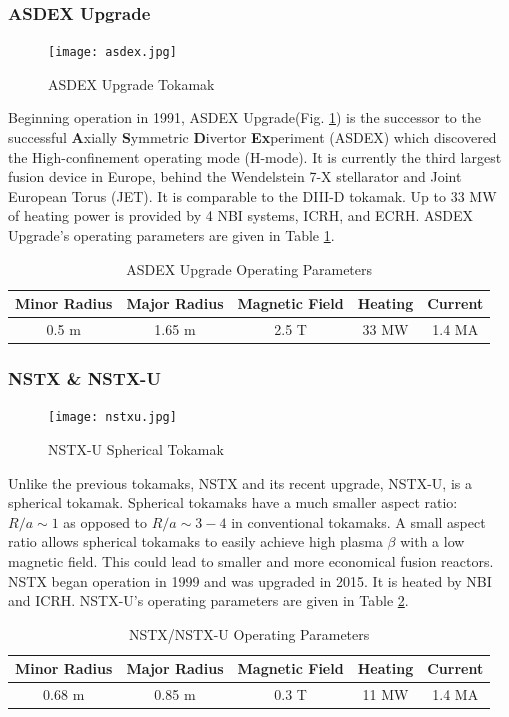 \subsubsection{ASDEX Upgrade}
\begin{figure}[ht]
    \centering
    \texttt{[image: asdex.jpg]}
    \caption{ASDEX Upgrade Tokamak\cite{geiger2013thesis}}
    \label{fig:augd}
\end{figure}
Beginning operation in 1991, ASDEX Upgrade(Fig. \ref{fig:augd}) is the successor to the successful \textbf{A}xially \textbf{S}ymmetric \textbf{D}ivertor \textbf{Ex}periment (ASDEX) which discovered the High-confinement operating mode (H-mode)\cite{wagner1982hmode}. It is currently the third largest fusion device in Europe, behind the Wendelstein 7-X stellarator\cite{wendelstein7x1993} and Joint European Torus (JET)\cite{jet1985}. It is comparable to the DIII-D tokamak. Up to 33 MW of heating power is provided by 4 NBI systems, ICRH, and ECRH. ASDEX Upgrade's operating parameters are given in Table \ref{tab:augd}. 
\begin{table}[]
    \centering
    \caption{ASDEX Upgrade Operating Parameters}
    \label{tab:augd}
    \begin{tabular}{ccccc}
        \textbf{Minor Radius} & \textbf{Major Radius} & \textbf{Magnetic Field} & \textbf{Heating} & \textbf{Current} \\ \hline \hline
        0.5 m & 1.65 m & 2.5 T & 33 MW & 1.4 MA \\ \hline
    \end{tabular}
\end{table}

\subsubsection{NSTX \& NSTX-U}
\begin{figure}[ht]
    \centering
    \texttt{[image: nstxu.jpg]}
    \caption{NSTX-U Spherical Tokamak}
    \label{fig:nstx}
\end{figure}
Unlike the previous tokamaks, NSTX and its recent upgrade, NSTX-U, is a spherical tokamak. Spherical tokamaks have a much smaller aspect ratio: $R/a\sim1$ as opposed to $R/a\sim3-4$ in conventional tokamaks. A small aspect ratio allows spherical tokamaks to easily achieve high plasma $\beta$ with a low magnetic field. This could lead to smaller and more economical fusion reactors. NSTX began operation in 1999 and was upgraded in 2015. It is heated by NBI and ICRH. NSTX-U's operating parameters are given in Table \ref{tab:nstx}. 
\begin{table}[h!]
    \centering
    \caption{NSTX/NSTX-U Operating Parameters}
    \label{tab:nstx}
    \begin{tabular}{ccccc}
        \textbf{Minor Radius} & \textbf{Major Radius} & \textbf{Magnetic Field} & \textbf{Heating} & \textbf{Current} \\ \hline \hline
        0.68 m & 0.85 m & 0.3 T & 11 MW & 1.4 MA \\ \hline
    \end{tabular}
\end{table}

